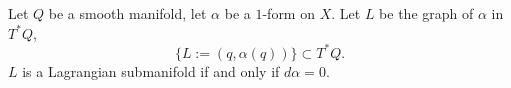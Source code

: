 

    Let $Q$ be a smooth manifold,  let $\alpha$ be a $1$-form on $X$.
    Let $L$ be the graph of $\alpha$ in $T^*Q$,
    \[\{L:=(q, \alpha(q))\}\subset T^*Q.\]
    $L$ is a Lagrangian submanifold if and only if $d\alpha=0$.

